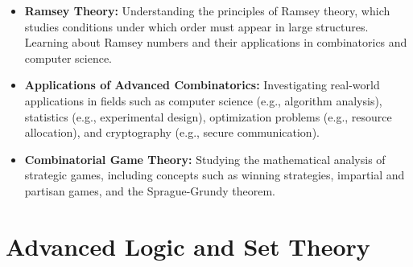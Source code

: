 \documentclass[openany]{book}
\begin{document}
\begin{itemize}
    \item \textbf{Ramsey Theory:} Understanding the principles of Ramsey theory, which studies conditions under which order must appear in large structures. Learning about Ramsey numbers and their applications in combinatorics and computer science.
    \item \textbf{Applications of Advanced Combinatorics:} Investigating real-world applications in fields such as computer science (e.g., algorithm analysis), statistics (e.g., experimental design), optimization problems (e.g., resource allocation), and cryptography (e.g., secure communication).
    \item \textbf{Combinatorial Game Theory:} Studying the mathematical analysis of strategic games, including concepts such as winning strategies, impartial and partisan games, and the Sprague-Grundy theorem.
\end{itemize}
\section{Advanced Logic and Set Theory}
\end{document}
